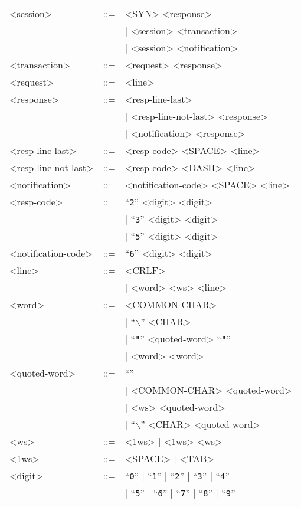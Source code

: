 \documentclass[twoside,a4paper,11pt]{article}
\begin{document}
\begin{longtable}{lcl}
<session> & ::= & <SYN> <response> \\
 & & | <session> <transaction> \\
 & & | <session> <notification> \\
<transaction> & ::= & <request> <response> \\
<request> & ::= & <line> \\
<response> & ::= & <resp-line-last> \\
 & & | <resp-line-not-last> <response> \\
 & & | <notification> <response> \\
<resp-line-last> & ::= & <resp-code> <SPACE> <line> \\
<resp-line-not-last> & ::= & <resp-code> <DASH> <line> \\
<notification> & ::= & <notification-code> <SPACE> <line> \\
<resp-code> & ::= & ``\texttt{2}'' <digit> <digit> \\
 & & | ``\texttt{3}'' <digit> <digit> \\
 & & | ``\texttt{5}'' <digit> <digit> \\
<notification-code> & ::= & ``\texttt{6}'' <digit> <digit> \\
<line> & ::= & <CRLF> \\
 & & | <word> <ws> <line> \\
<word> & ::= & <COMMON-CHAR> \\
 & & | ``\texttt{$\backslash$}'' <CHAR> \\
 & & | ``\texttt{"}'' <quoted-word> ``\texttt{"}'' \\
 & & | <word> <word> \\
<quoted-word> & ::= & ``'' \\
 & & | <COMMON-CHAR> <quoted-word> \\
 & & | <ws> <quoted-word> \\
 & & | ``\texttt{$\backslash$}'' <CHAR> <quoted-word> \\
<ws> & ::= & <1ws> | <1ws> <ws> \\
<1ws> & ::= & <SPACE> | <TAB> \\
<digit> & ::= & ``\texttt{0}'' |
``\texttt{1}'' | ``\texttt{2}'' |
``\texttt{3}'' | ``\texttt{4}'' \\
& & | ``\texttt{5}'' | ``\texttt{6}'' |
``\texttt{7}'' | ``\texttt{8}'' |
``\texttt{9}''
\end{longtable}
\end{document}
